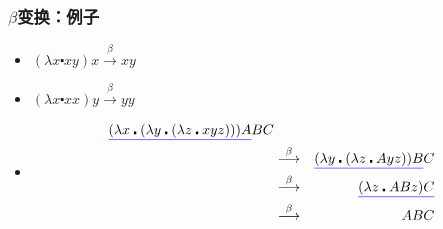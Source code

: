 \documentclass[CJKutf8,compress,hyperref]{beamer}
\begin{document}
\begin{CJK}{UTF8}{song}
\begin{frame}
  \frametitle{$\beta$变换：例子} 
  \begin{itemize}
  \item $(\lambda x \centerdot xy) x \stackrel{\beta}{\longrightarrow} xy$
  \item $(\lambda x \centerdot xx) y \stackrel{\beta}{\longrightarrow} yy$
  \item  
    \begin{eqnarray*}
      {\color{blue}\underline{{\color{black}(\lambda x \centerdot (\lambda y \centerdot (\lambda z \centerdot xyz)))A}}}BC & & \\
                                                                                                                           & \stackrel{\beta}{\longrightarrow} & {\color{blue}\underline{{\color{black}(\lambda y \centerdot (\lambda z \centerdot Ayz))B}}}C \\
                                                                                                                           & \stackrel{\beta}{\longrightarrow} & {\color{blue}\underline{{\color{black}(\lambda z \centerdot ABz)C}}} \\ 
                                                                                                                           & \stackrel{\beta}{\longrightarrow} & ABC 
    \end{eqnarray*} 
  \end{itemize}
\end{frame} 


\end{CJK}
\end{document}
